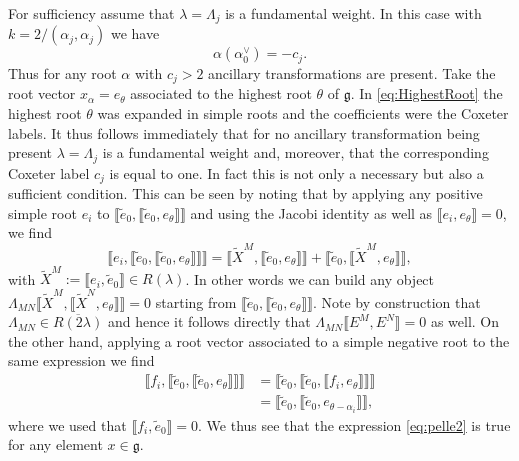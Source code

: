 For sufficiency assume that $\lambda=\Lambda_j$ is a fundamental weight. In this case with $k=2/(\alpha_j,\alpha_j)$ we have
\begin{equation}
    \alpha(\alpha_0^\vee) = -c_j.
\end{equation}
Thus for any root $\alpha$ with $c_j>2$ ancillary transformations are present. Take the root vector $x_\alpha = e_\theta$ associated to the highest root $\theta$ of $\mathfrak{g}$. In \eqref{eq:HighestRoot} the highest root $\theta$ was expanded in simple roots and the coefficients were the Coxeter labels. It thus follows immediately that for no ancillary transformation being present $\lambda=\Lambda_j$ is a fundamental weight and, moreover, that the corresponding Coxeter label $c_j$ is equal to one. In fact this is not only a necessary but also a sufficient condition. This can be seen by noting that by applying any positive simple root $e_i$ to $\llbracket \tilde{e}_0,\llbracket\tilde{e}_0,e_\theta\rrbracket\rrbracket$ and using the Jacobi identity as well as $\llbracket e_i,e_\theta\rrbracket=0$, we find 
\begin{equation}\label{eq:pelle2}
    \llbracket e_i, \llbracket \tilde{e}_0,\llbracket\tilde{e}_0,e_\theta\rrbracket\rrbracket\rrbracket = \llbracket\tilde{X}^M,\llbracket\tilde{e}_0,e_\theta\rrbracket\rrbracket+\llbracket\tilde{e}_0,\llbracket\tilde{X}^M,e_\theta\rrbracket\rrbracket,
\end{equation}
with $\tilde{X}^M:=\llbracket e_i,\tilde{e}_0\rrbracket\in R(\lambda)$. In other words we can build any object $\Lambda_{MN}\llbracket \tilde{X}^M,\llbracket\tilde{X}^N,e_\theta\rrbracket\rrbracket=0$ starting from $\llbracket\tilde{e}_0,\llbracket\tilde{e}_0,e_\theta\rrbracket\rrbracket$. Note by construction that $\Lambda_{MN}\in \overbar{R(2\lambda)}$ and hence it follows directly that $\Lambda_{MN}\llbracket E^M,E^N\rrbracket=0$ as well. On the other hand, applying a root vector associated to a simple negative root to the same expression we find 
\begin{equation}
    \begin{aligned}
        \llbracket f_i,\llbracket \tilde{e}_0,\llbracket\tilde{e}_0,e_\theta\rrbracket\rrbracket\rrbracket &= \llbracket \tilde{e}_0,\llbracket\tilde{e}_0,\llbracket f_i,e_\theta\rrbracket\rrbracket\rrbracket\\
        &= \llbracket\tilde{e}_0,\llbracket\tilde{e}_0,e_{\theta-\alpha_i}\rrbracket\rrbracket,
        \end{aligned}
\end{equation}
where we used that $\llbracket f_i,\tilde{e}_0\rrbracket=0$. We thus see that the expression \eqref{eq:pelle2} is true for any element $x\in\mathfrak{g}$. 

